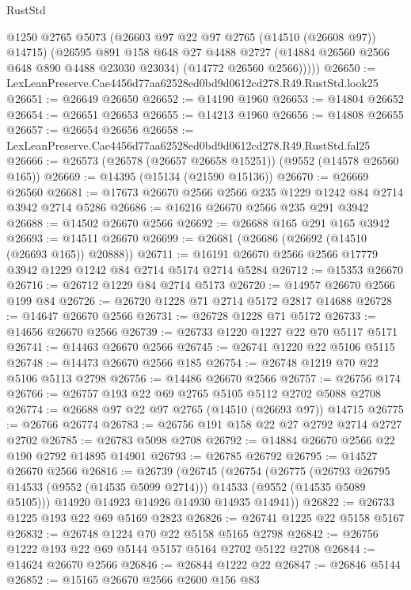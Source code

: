 \begin{lexlean}{RustStd}
\begin{coremodule}
          @1250
          @2765
          @5073
          (@26603 @97 @22 @97 @2765 (@14510 (@26608 @97)) @14715)
          (@26595
            @891
            @158
            @648
            @27
            @4488
            @2727
            (@14884 @26560 @2566 @648 @890 @4488 @23030 @23034)
            (@14772 @26560 @2566)))))
@26650 := LexLeanPreserve.Cae4456d77aa62528ed0bd9d0612cd278.R49.RustStd.look25
@26651 := @26649 @26650
@26652 := @14190 @1960
@26653 := @14804 @26652
@26654 := @26651 @26653
@26655 := @14213 @1960
@26656 := @14808 @26655
@26657 := @26654 @26656
@26658 := LexLeanPreserve.Cae4456d77aa62528ed0bd9d0612cd278.R49.RustStd.fal25
@26666 := @26573 (@26578 (@26657 @26658 @15251)) (@9552 (@14578 @26560 @165))
@26669 := @14395 (@15134 (@21590 @15136))
@26670 := @26669 @26560
@26681 := @17673 @26670 @2566 @2566 @235 @1229 @1242 @84 @2714 @3942 @2714 @5286
@26686 := @16216 @26670 @2566 @235 @291 @3942
@26688 := @14502 @26670 @2566
@26692 := @26688 @165 @291 @165 @3942
@26693 := @14511 @26670
@26699 := @26681 (@26686 (@26692 (@14510 (@26693 @165)) @20888))
@26711 := @16191 @26670 @2566 @2566 @17779 @3942 @1229 @1242 @84 @2714 @5174 @2714 @5284
@26712 := @15353 @26670
@26716 := @26712 @1229 @84 @2714 @5173
@26720 := @14957 @26670 @2566 @199 @84
@26726 := @26720 @1228 @71 @2714 @5172 @2817 @14688
@26728 := @14647 @26670 @2566
@26731 := @26728 @1228 @71 @5172
@26733 := @14656 @26670 @2566
@26739 := @26733 @1220 @1227 @22 @70 @5117 @5171
@26741 := @14463 @26670 @2566
@26745 := @26741 @1220 @22 @5106 @5115
@26748 := @14473 @26670 @2566 @185
@26754 := @26748 @1219 @70 @22 @5106 @5113 @2798
@26756 := @14486 @26670 @2566
@26757 := @26756 @174
@26766 := @26757 @193 @22 @69 @2765 @5105 @5112 @2702 @5088 @2708
@26774 := @26688 @97 @22 @97 @2765 (@14510 (@26693 @97)) @14715
@26775 := @26766 @26774
@26783 := @26756 @191 @158 @22 @27 @2792 @2714 @2727 @2702
@26785 := @26783 @5098 @2708
@26792 := @14884 @26670 @2566 @22 @190 @2792 @14895 @14901
@26793 := @26785 @26792
@26795 := @14527 @26670 @2566
@26816 := @26739
    (@26745
      (@26754
        (@26775
          (@26793 @26795 @14533 (@9552 (@14535 @5099 @2714)))
          @14533
          (@9552 (@14535 @5089 @5105)))
        @14920
        @14923
        @14926
        @14930
        @14935
        @14941))
@26822 := @26733 @1225 @193 @22 @69 @5169 @2823
@26826 := @26741 @1225 @22 @5158 @5167
@26832 := @26748 @1224 @70 @22 @5158 @5165 @2798
@26842 := @26756 @1222 @193 @22 @69 @5144 @5157 @5164 @2702 @5122 @2708
@26844 := @14624 @26670 @2566
@26846 := @26844 @1222 @22
@26847 := @26846 @5144
@26852 := @15165 @26670 @2566 @2600 @156 @83

\end{coremodule}
\end{lexlean}
